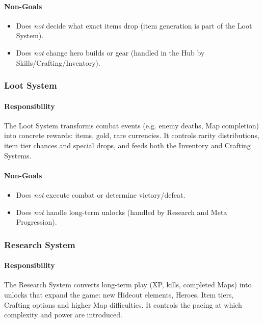 \paragraph{Non-Goals}
\begin{itemize}
	\item Does \emph{not} decide what exact items drop (item generation is part of the Loot System).
	\item Does \emph{not} change hero builds or gear (handled in the Hub by Skills/Crafting/Inventory).
\end{itemize}

\subsubsection*{Loot System}

\paragraph{Responsibility}
The Loot System transforms combat events (e.g. enemy deaths, Map completion) into concrete rewards: 
items, gold, rare currencies. It controls rarity distributions, item tier chances and special drops, and 
feeds both the Inventory and Crafting Systems.

\paragraph{Non-Goals}
\begin{itemize}
	\item Does \emph{not} execute combat or determine victory/defeat.
	\item Does \emph{not} handle long-term unlocks (handled by Research and Meta Progression).
\end{itemize}

\subsubsection*{Research System}

\paragraph{Responsibility}
The Research System converts long-term play (XP, kills, completed Maps) into unlocks that expand the game:
new Hideout elements, Heroes, Item tiers, Crafting options and higher Map difficulties. It controls the pacing 
at which complexity and power are introduced.

